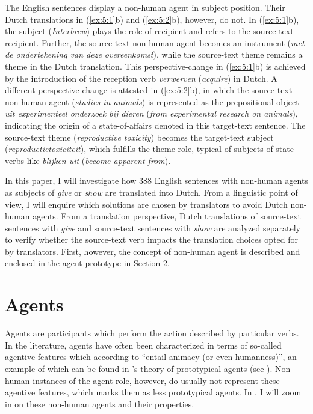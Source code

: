 \documentclass[output=paper]{LSP/langsci}
\begin{document}

The English sentences display a non-human agent in subject position. Their Dutch translations in (\ref{ex:5:1}b) and (\ref{ex:5:2}b), however, do not. In (\ref{ex:5:1}b), the subject (\textit{Interbrew}) plays the role of recipient and refers to the source-text recipient. Further, the source-text non-human agent becomes an instrument (\textit{met de ondertekening van deze overeenkomst}), while the source-text theme remains a theme in the Dutch translation. This perspective-change in (\ref{ex:5:1}b) is achieved by the introduction of the reception verb \textit{verwerven} (\textit{acquire}) in Dutch. A different perspective-change is attested in (\ref{ex:5:2}b), in which the source-text non-human agent (\textit{studies in animals}) is represented as the prepositional object \textit{uit experimenteel onderzoek bij dieren} (\textit{from experimental research on animals}), indicating the origin of a state-of-affairs denoted in this target-text sentence. The source-text theme (\textit{reproductive toxicity}) becomes the target-text subject (\textit{reproductietoxiciteit}), which fulfills the theme role, typical of subjects of state verbs like \textit{blijken uit} (\textit{become apparent from}).

In this paper, I will investigate how 388 English sentences with non-human agents as subjects of \textit{give} or \textit{show} are translated into Dutch. From a linguistic point of view, I will enquire which solutions are chosen by translators to avoid Dutch non-human agents. From a translation perspective, Dutch translations of source-text sentences with \textit{give} and source-text sentences with \textit{show} are analyzed separately to verify whether the source-text verb impacts the translation choices opted for by translators. First, however, the concept of non-human agent is described and enclosed in the agent prototype in Section 2. 

\section{Agents} \label{sec:5:2}

Agents are participants which perform the action described by particular verbs. In the literature, agents have often been characterized in terms of so-called agentive features which according to \citet[49]{Hundt2004} “entail animacy (or even humanness)”, an example of which can be found in \citeauthor{Dowty1991}'s \citeyear{Dowty1991} theory of prototypical agents (see ). Non-human instances of the agent role, however, do usually not represent these agentive features, which marks them as less prototypical agents. In , I will zoom in on these non-human agents and their properties. 
\end{document}
